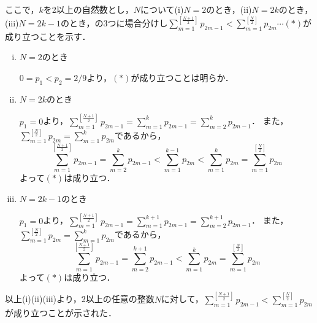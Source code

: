 \documentclass{jsarticle}
\begin{document}
\begin{enumerate}[(1)]
			ここで，$k$を2以上の自然数とし，$N$について(i)$N=2$のとき，(ii)$N=2k$のとき，(iii)$N=2k-1$のとき，の3つに場合分けし$\displaystyle \sum_{m=1}^{[\frac{N+1}{2}]}p_{2m-1}<\sum_{m=1}^{[\frac{N}{2}]}p_{2m}\cdots (\ast)$が成り立つことを示す．
			\begin{enumerate}[(i)]
				\item $N=2$のとき
							
							$0=p_1<p_2=2/9$より，$(\ast)$が成り立つことは明らか．
				\item $N=2k$のとき
				
							$p_1=0$より，$\displaystyle \sum_{m=1}^{[\frac{N+1}{2}]}p_{2m-1}=\sum_{m=1}^kp_{2m-1}=\sum_{m=2}^kp_{2m-1}$．
							また，$\sum_{m=1}^{[\frac{N}{2}]}p_{2m}=\sum_{m=1}^kp_{2m}$であるから，
							\[
								\sum_{m=1}^{[\frac{N+1}{2}]}p_{2m-1}
								=\sum_{m=2}^kp_{2m-1}
								<\sum_{m=1}^{k-1}p_{2m}
								<\sum_{m=1}^kp_{2m}
								=\sum_{m=1}^{[\frac{N}{2}]}p_{2m}
							\]
							よって$(\ast)$は成り立つ．
				\item $N=2k-1$のとき
							
							$p_1=0$より，$\displaystyle \sum_{m=1}^{[\frac{N+1}{2}]}p_{2m-1}=\sum_{m=1}^{k+1}p_{2m-1}=\sum_{m=2}^{k+1}p_{2m-1}$．
							また，$\sum_{m=1}^{[\frac{N}{2}]}p_{2m}=\sum_{m=1}^kp_{2m}$であるから，
							\[
								\sum_{m=1}^{[\frac{N+1}{2}]}p_{2m-1}
								=\sum_{m=2}^{k+1}p_{2m-1}
								<\sum_{m=1}^kp_{2m}
								=\sum_{m=1}^{[\frac{N}{2}]}p_{2m}
							\]
							よって$(\ast)$は成り立つ．
			\end{enumerate}
			以上(i)(ii)(iii)より，2以上の任意の整数$N$に対して，$\displaystyle \sum_{m=1}^{[\frac{N+1}{2}]}p_{2m-1}<\sum_{m=1}^{[\frac{N}{2}]}p_{2m}$が成り立つことが示された．
			
\end{enumerate}
\end{document}
